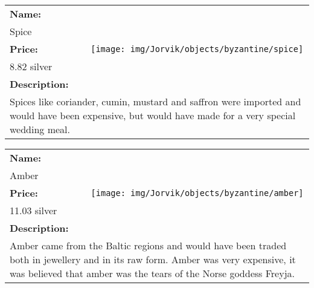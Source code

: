 \begin{table}[ht!]
	\centering
	\begin{tabular}{ p{3cm} c }\toprule
		\textbf{Name:} & \multirow{5}{*}{\texttt{[image: img/Jorvik/objects/byzantine/spice]}}\\
		Spice & \\ 
		\textbf{Price:} & \\
		8.82 silver & \\ 
		\textbf{Description:} & \\
		\multicolumn{2}{p{12cm}}{Spices like coriander, cumin, mustard and saffron were imported and would have been expensive, but would have made for a very special wedding meal. }\\
		\bottomrule
	\end{tabular}
\end{table}

\begin{table}[ht!]
	\centering
	\begin{tabular}{ p{3cm} c }\toprule
		\textbf{Name:} & \multirow{5}{*}{\texttt{[image: img/Jorvik/objects/byzantine/amber]}}\\
		Amber & \\ 
		\textbf{Price:} & \\
		11.03 silver & \\ 
		\textbf{Description:} & \\
		\multicolumn{2}{p{12cm}}{Amber came from the Baltic regions and would have been traded both in jewellery and in its raw form. Amber was very expensive, it was believed that amber was the tears of the Norse goddess Freyja.}\\
		\bottomrule
	\end{tabular}
\end{table}